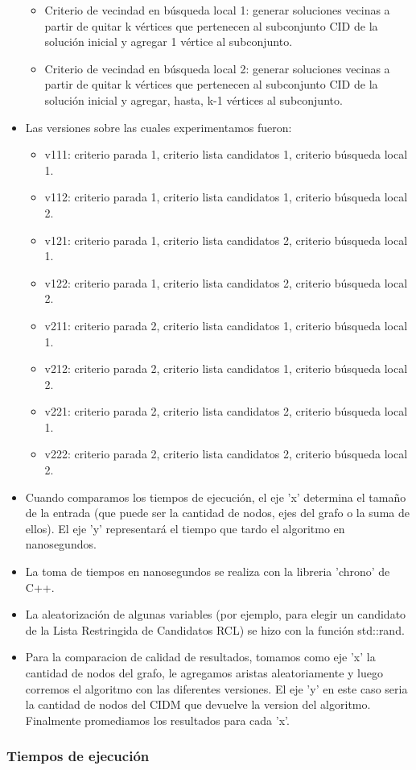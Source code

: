\begin{itemize}
\begin{itemize}
        \item Criterio de vecindad en búsqueda local 1: generar soluciones vecinas a partir de quitar k vértices que pertenecen al subconjunto CID de la solución inicial y agregar 1 vértice al subconjunto.
        \item Criterio de vecindad en búsqueda local 2: generar soluciones vecinas a partir de quitar k vértices que pertenecen al subconjunto CID de la solución inicial y agregar, hasta, k-1 vértices al subconjunto.
    \end{itemize}
    \item Las versiones sobre las cuales experimentamos fueron:
    \begin{itemize}
        \item v111: criterio parada 1, criterio lista candidatos 1, criterio búsqueda local 1.
        \item v112: criterio parada 1, criterio lista candidatos 1, criterio búsqueda local 2.
        \item v121: criterio parada 1, criterio lista candidatos 2, criterio búsqueda local 1.
        \item v122: criterio parada 1, criterio lista candidatos 2, criterio búsqueda local 2.
        \item v211: criterio parada 2, criterio lista candidatos 1, criterio búsqueda local 1.
        \item v212: criterio parada 2, criterio lista candidatos 1, criterio búsqueda local 2.
        \item v221: criterio parada 2, criterio lista candidatos 2, criterio búsqueda local 1.
        \item v222: criterio parada 2, criterio lista candidatos 2, criterio búsqueda local 2.
    \end{itemize}
    \item Cuando comparamos los tiempos de ejecución, el eje 'x' determina el tamaño de la entrada (que puede ser la cantidad de nodos, ejes del grafo o la suma de ellos). El eje 'y' representará el tiempo que tardo el algoritmo en nanosegundos.
    \item La toma de tiempos en nanosegundos se realiza con la libreria 'chrono' de C++.
    \item La aleatorización de algunas variables (por ejemplo, para elegir un candidato de la Lista Restringida de Candidatos RCL) se hizo con la función std::rand.
    \item Para la comparacion de calidad de resultados, tomamos como eje 'x' la cantidad de nodos del grafo, le agregamos aristas aleatoriamente y luego corremos el algoritmo con las diferentes versiones. El eje 'y' en este caso seria la cantidad de nodos del CIDM que devuelve la version del algoritmo. Finalmente promediamos los resultados para cada 'x'.

\end{itemize}

\subsubsection{Tiempos de ejecución}
